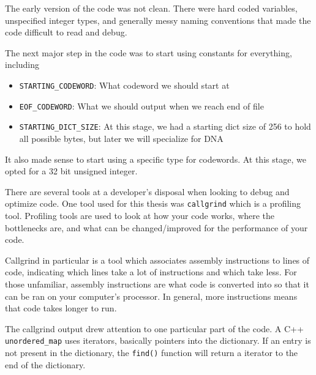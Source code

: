 \documentclass[12pt,twoside]{reedthesis}
\providecommand{\tightlist}{%
  \setlength{\itemsep}{0pt}\setlength{\parskip}{0pt}}
\begin{document}
The early version of the code was not clean. There were hard coded variables, unspecified integer types, and generally messy naming conventions that made the code difficult to read and debug.

The next major step in the code was to start using constants for everything, including
\begin{itemize}
\tightlist
\item
  \texttt{STARTING\_CODEWORD}: What codeword we should start at
\item
  \texttt{EOF\_CODEWORD}: What we should output when we reach end of file
\item
  \texttt{STARTING\_DICT\_SIZE}: At this stage, we had a starting dict size of 256 to hold all possible bytes, but later we will specialize for DNA
\end{itemize}
It also made sense to start using a specific type for codewords. At this stage, we opted for a 32 bit unsigned integer.

There are several tools at a developer's disposal when looking to debug and optimize code. One tool used for this thesis was \texttt{callgrind} which is a profiling tool. Profiling tools are used to look at how your code works, where the bottlenecks are, and what can be changed/improved for the performance of your code.

Callgrind in particular is a tool which associates assembly instructions to lines of code, indicating which lines take a lot of instructions and which take less. For those unfamiliar, assembly instructions are what code is converted into so that it can be ran on your computer's processor. In general, more instructions means that code takes longer to run.

The callgrind output drew attention to one particular part of the code. A C++ \texttt{unordered\_map} uses iterators, basically pointers into the dictionary. If an entry is not present in the dictionary, the \texttt{find()} function will return a iterator to the end of the dictionary.
\end{document}
